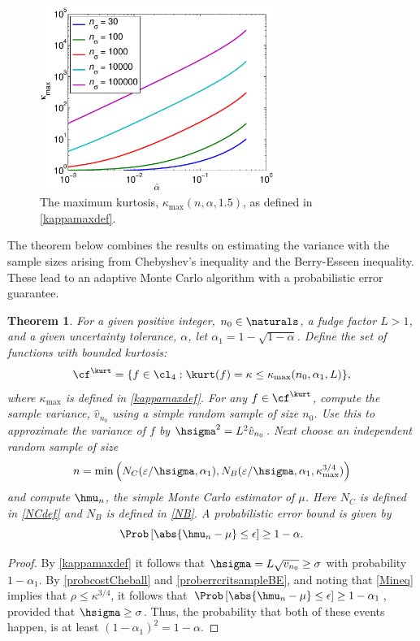 \documentclass[12pt]{amsart}
\newcommand{\hv}{\hat{v}}
\newtheorem{theorem}{Theorem}
\begin{document}
\begin{figure}
\centering
\includegraphics[width=3in]{kurtmaxfig.eps}
\caption{The maximum kurtosis, $\kappa_{\max}(n,\alpha,1.5)$, as defined in \eqref{kappamaxdef}. \label{kurtmaxfig}}
\end{figure}

The theorem below combines the results on estimating the variance with the sample sizes arising from Chebyshev's inequality and the Berry-Esseen inequality.  These lead to an adaptive Monte Carlo algorithm with a probabilistic error guarantee.

\begin{theorem} \label{mainadaptthm} For a given positive integer, $n_0 \in \naturals$, a fudge factor $L>1$, and a given uncertainty tolerance, $\alpha$, let $\alpha_1 = 1 - \sqrt{1 - \alpha}$.  Define the set of functions with bounded kurtosis:
\[
\cf^{\kurt}= \{f \in \cl_{4} : \kurt(f)= \kappa \le \kappa_{\max}(n_0,\alpha_1,L) \},
\]
where $\kappa_{\max}$ is defined in \eqref{kappamaxdef}.  For any $f \in \cf^{\kurt}$, compute the sample variance, $\hv_{n_0}$ using a simple random sample of size $n_0$. Use this to approximate the variance of $f$ by $\hsigma^2 = L^2 \hv_{n_0}$.  Next choose an independent random sample of size
\[
n = \min\left( N_C(\varepsilon/\hsigma,\alpha_1), N_B(\varepsilon/\hsigma,\alpha_1,\kappa_{\max}^{3/4}) \right)
\]
and compute $\hmu_n$, the simple Monte Carlo estimator of $\mu$.  Here $N_C$ is defined in \eqref{NCdef} and  $N_B$ is defined in \eqref{NB}.  A probabilistic error bound is given by
\[
\Prob\left[\abs{\hmu_n-\mu} \le \epsilon \right] \geq 1-\alpha.
\]
\end{theorem}
\begin{proof}
By \eqref{kappamaxdef} it follows that $\hsigma= L \sqrt{v_{n_0}}  \ge \sigma$ with probability $1-\alpha_1$.  By  \eqref{probcostCheball} and \eqref{proberrcritsampleBE}, and noting that \eqref{Mineq} implies that $\rho \le \kappa^{3/4}$, it follows that  $\Prob\left[\abs{\hmu_n-\mu} \le \epsilon \right] \geq 1-\alpha_1$, provided that $\hsigma  \ge \sigma$.  Thus, the probability that both of these events happen, is at least $(1-\alpha_1)^2=1-\alpha$.
\end{proof}
\end{document}
